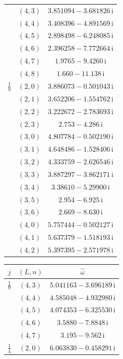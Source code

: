\begin{table}[H]
\begin{minipage}[t]{0.325\textwidth}
\begin{tabular}[t]{|c|c|c|}
 & $(4,3)$ & $3.851094-3.681826\,\mathrm{i}$ \\
 & $(4,4)$ & $3.408396-4.891569\,\mathrm{i}$ \\
 & $(4,5)$ & $2.898498-6.248085\,\mathrm{i}$ \\
 & $(4,6)$ & $2.396258-7.772664\,\mathrm{i}$ \\
 & $(4,7)$ & $1.9765-9.4260\,\mathrm{i}$ \\
 & $(4,8)$ & $1.660-11.138\,\mathrm{i}$ \\
\hline
$\tfrac19$ & $(2,0)$ & $3.886073-0.501043\,\mathrm{i}$ \\
 & $(2,1)$ & $3.652206-1.554762\,\mathrm{i}$ \\
 & $(2,2)$ & $3.222672-2.783693\,\mathrm{i}$ \\
 & $(2,3)$ & $2.753-4.286\,\mathrm{i}$ \\
 & $(3,0)$ & $4.807784-0.502190\,\mathrm{i}$ \\
 & $(3,1)$ & $4.648486-1.528406\,\mathrm{i}$ \\
 & $(3,2)$ & $4.333759-2.626546\,\mathrm{i}$ \\
 & $(3,3)$ & $3.887297-3.862171\,\mathrm{i}$ \\
 & $(3,4)$ & $3.38610-5.29900\,\mathrm{i}$ \\
 & $(3,5)$ & $2.954-6.925\,\mathrm{i}$ \\
 & $(3,6)$ & $2.669-8.630\,\mathrm{i}$ \\
 & $(4,0)$ & $5.757444-0.502127\,\mathrm{i}$ \\
 & $(4,1)$ & $5.637379-1.518193\,\mathrm{i}$ \\
 & $(4,2)$ & $5.397395-2.571978\,\mathrm{i}$ \\
\hline
\end{tabular}
\end{minipage}\hfill
\begin{minipage}[t]{0.325\textwidth}
\centering
\begin{tabular}[t]{|c|c|c|}
\hline
$j$ & $(L,n)$ & $\widehat{\omega}$ \\
\hline
$\tfrac19$ & $(4,3)$ & $5.041163-3.696189\,\mathrm{i}$ \\
 & $(4,4)$ & $4.585048-4.932980\,\mathrm{i}$ \\
 & $(4,5)$ & $4.074353-6.325530\,\mathrm{i}$ \\
 & $(4,6)$ & $3.5880-7.8848\,\mathrm{i}$ \\
 & $(4,7)$ & $3.195-9.562\,\mathrm{i}$ \\
\hline
$\tfrac14$ & $(2,0)$ & $6.063830-0.458291\,\mathrm{i}$ \\

\end{tabular}
\end{minipage}
\end{table}
